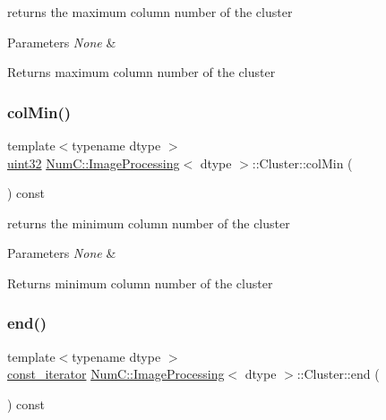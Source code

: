 returns the maximum column number of the cluster


\begin{DoxyParams}{Parameters}
{\em None} & \\
\hline
\end{DoxyParams}
\begin{DoxyReturn}{Returns}
maximum column number of the cluster 
\end{DoxyReturn}
\mbox{\label{class_num_c_1_1_image_processing_1_1_cluster_a134813f8578f28a62bb3f5995fb3fc30}} 
\subsubsection{\texorpdfstring{col\+Min()}{colMin()}}
{\footnotesize\ttfamily template$<$typename dtype $>$ \\
\mbox{\hyperlink{namespace_num_c_ae685802ca6d3035f2b400b081e3953fa}{uint32}} \mbox{\hyperlink{class_num_c_1_1_image_processing}{Num\+C\+::\+Image\+Processing}}$<$ dtype $>$\+::Cluster\+::col\+Min (\begin{DoxyParamCaption}{ }\end{DoxyParamCaption}) const\hspace{0.3cm}{\ttfamily [inline]}}

returns the minimum column number of the cluster


\begin{DoxyParams}{Parameters}
{\em None} & \\
\hline
\end{DoxyParams}
\begin{DoxyReturn}{Returns}
minimum column number of the cluster 
\end{DoxyReturn}
\mbox{\label{class_num_c_1_1_image_processing_1_1_cluster_ad3ac71a698ea0bbcc1fc5f71b4dc4eb7}} 
\subsubsection{\texorpdfstring{end()}{end()}}
{\footnotesize\ttfamily template$<$typename dtype $>$ \\
\mbox{\hyperlink{class_num_c_1_1_image_processing_1_1_cluster_a15d2f9ebeba9062779e57a6fdce9faa0}{const\+\_\+iterator}} \mbox{\hyperlink{class_num_c_1_1_image_processing}{Num\+C\+::\+Image\+Processing}}$<$ dtype $>$\+::Cluster\+::end (\begin{DoxyParamCaption}{ }\end{DoxyParamCaption}) const\hspace{0.3cm}{\ttfamily [inline]}}

